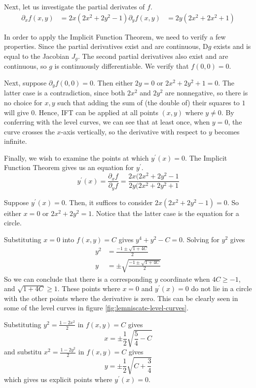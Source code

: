 \documentclass[letterpaper,11pt]{article}
\newcommand{\D}{\mathrm{D}}
\begin{document}
Next, let us investigate the partial derivates of $f$.
\begin{align*}
    \partial_x f(x, y) &= 2x(2x^2 + 2y^2 - 1)
    \partial_y f(x, y) &= 2y(2x^2 + 2x^2 + 1)
\end{align*}

In order to apply the Implicit Function Theorem, we need to verify a few
properties. Since the partial derivatives exist and are continuous,
$\D g$ exists and is equal to the Jacobian $J_g$. The second partial
derivatives also exist and are continuous, so $g$ is continuously
differentiable. We verify that $f(0, 0) = 0$.

Next, suppose $\partial_y f(0, 0) = 0$. Then either $2y = 0$ or
$2x^2 + 2y^2 + 1 = 0$. The latter case is a contradiction, since both $2x^2$
and $2y^2$ are nonnegative, so there is no choice for $x, y$ such that adding
the sum of (the double of) their squares to $1$ will give $0$. Hence, IFT can
be applied at all points $(x, y)$ where $y \neq 0$. By conferring with the
level curves, we can see that at least once, when $y = 0$, the curve crosses
the $x$-axis vertically, so the derivative with respect to $y$ becomes
infinite.

Finally, we wish to examine the points at which $y^\prime(x) = 0$.
The Implicit Function Theorem gives us an equation for $y^\prime$.
\begin{equation*}
    y^\prime(x) = \frac{\partial_x f}{\partial_y f}
    = \frac{2x(2x^2 + 2y^2 - 1}{2y(2x^2 + 2y^2 + 1}
\end{equation*}

Suppose $y^\prime(x) = 0$. Then, it suffices to consider
$2x(2x^2 + 2y^2 - 1) = 0$. So either $x = 0$ or $2x^2 + 2y^2 = 1$. Notice that
the latter case is the equation for a circle.

Substituting $x = 0$ into $f(x, y) = C$ gives $y^4 + y^2 - C = 0$. Solving for
$y^2$ gives
\begin{align*}
    y^2 &= \frac{-1 \pm \sqrt{1 + 4C}}{2} \\
    y &= \pm \sqrt{ \frac{-1 \pm \sqrt{1 + 4C}}{2} }
\end{align*}
So we can conclude that there is a corresponding $y$ coordinate when
$4C \geq -1$, and $\sqrt{1 + 4C} \geq 1$. These points where $x = 0$ and
$y^\prime(x) = 0$ do not lie in a circle with the other points where the
derivative is zero. This can be clearly seen in some of the level curves in
figure \ref{fig:lemniscate-level-curves}.

Substituting $y^2 = \frac{1 - 2x^2}{2}$ in $f(x, y) = C$ gives
\begin{equation*}
    x = \pm \frac{1}{2} \sqrt{\frac{5}{4} - C}
\end{equation*}
and substitu $x^2 = \frac{1 - 2y^2}{2}$ in $f(x, y) = C$ gives
\begin{equation*}
    y = \pm \frac{1}{2} \sqrt{C + \frac{3}{4}}
\end{equation*}
which gives us explicit points where $y^\prime(x) = 0$.
\end{document}
